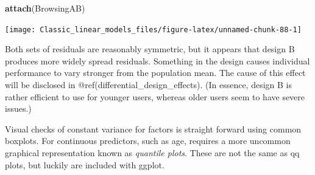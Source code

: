 \documentclass[]{svmono}
\newenvironment{Shaded}{\begin{snugshade}}{\end{snugshade}}
\newcommand{\KeywordTok}[1]{\textcolor[rgb]{0.13,0.29,0.53}{\textbf{#1}}}
\newcommand{\DataTypeTok}[1]{\textcolor[rgb]{0.13,0.29,0.53}{#1}}
\newcommand{\StringTok}[1]{\textcolor[rgb]{0.31,0.60,0.02}{#1}}
\newcommand{\OperatorTok}[1]{\textcolor[rgb]{0.81,0.36,0.00}{\textbf{#1}}}
\newcommand{\NormalTok}[1]{#1}
\begin{document}
\begin{Shaded}
\begin{Highlighting}[]
\KeywordTok{attach}\NormalTok{(BrowsingAB)}
\end{Highlighting}
\end{Shaded}

\begin{Shaded}
\end{Shaded}

\texttt{[image: Classic\_linear\_models\_files/figure-latex/unnamed-chunk-88-1]}

Both sets of residuals are reasonably symmetric, but it appears that
design B produces more widely spread residuals. Something in the design
causes individual performance to vary stronger from the population mean.
The cause of this effect will be disclosed in
@ref(differential\_design\_effects). (In essence, design B is rather
efficient to use for younger users, whereas older users seem to have
severe issues.)

Visual checks of constant variance for factors is straight forward using
common boxplots. For continuous predictors, such as age, requires a more
uncommon graphical representation known as \emph{quantile plots}. These
are not the same as qq plots, but luckily are included with ggplot.

\begin{Shaded}
\end{Shaded}
\end{document}
